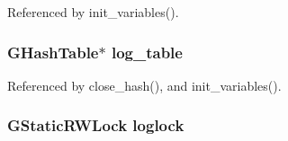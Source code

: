 Referenced by init\_\-variables().
\subsubsection[{log\_\-table}]{\setlength{\rightskip}{0pt plus 5cm}GHashTable$\ast$ {\bf log\_\-table}}\label{log_8h_c21e942e8435897b136b3859dc70b9d3}




Referenced by close\_\-hash(), and init\_\-variables().
\subsubsection[{loglock}]{\setlength{\rightskip}{0pt plus 5cm}GStaticRWLock {\bf loglock}}\label{log_8h_3b223291fa4004075742bdae0abe3422}



